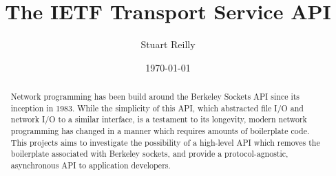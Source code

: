 \documentclass{l4proj}
\begin{document}
\title{The IETF Transport Service API}
\author{Stuart Reilly}
\date{\today}

\maketitle

\begin{abstract}
    Network programming has been build around the Berkeley Sockets API since its inception in 1983.
    While the simplicity of this API, which abstracted file I/O and network I/O to a similar interface,
    is a testament to its longevity, modern network programming has changed in a manner which requires
    amounts of boilerplate code.
    This projects aims to investigate the possibility of a high-level API which removes the boilerplate
    associated with Berkeley sockets, and provide a protocol-agnostic, asynchronous API to application developers.
\end{abstract}


%
%
\def\consentname {Stuart Reilly} %
\def\consentdate {\today} %
%
\educationalconsent


\tableofcontents
\end{document}

